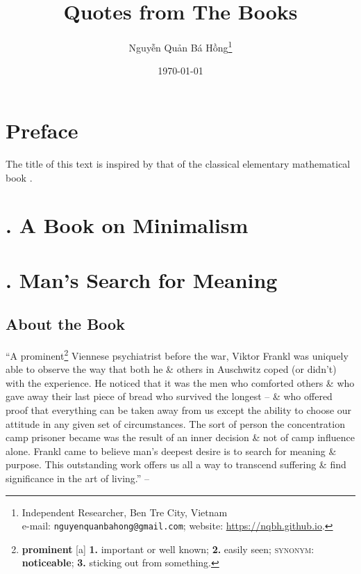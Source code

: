 \documentclass[oneside]{book}
\title{Quotes from The Books}
\author{\selectlanguage{vietnamese} Nguyễn Quản Bá Hồng\footnote{Independent Researcher, Ben Tre City, Vietnam\\e-mail: \texttt{nguyenquanbahong@gmail.com}; website: \url{https://nqbh.github.io}.}}
\date{\today}
\numberwithin{equation}{section}
\begin{document}
\frontmatter
\maketitle
\setcounter{secnumdepth}{4}
\setcounter{tocdepth}{3}
\tableofcontents
\newpage


\chapter*{Preface}

The title of this text is inspired by that of the classical elementary mathematical book \cite{Andreescu_Dospinescu2010}.


\mainmatter

\chapter{\cite{Chi2022}. A Book on Minimalism}


\chapter{\cite{Frankl2013, Frankl2017, Frankl2022}. Man's Search for Meaning}

\section{About the Book}
``A prominent\footnote{\textbf{prominent} [a] \textbf{1.} important or well known; \textbf{2.} easily seen; \textsc{synonym}: \textbf{noticeable}; \textbf{3.} sticking out from something.} Viennese psychiatrist before the war, Viktor Frankl was uniquely able to observe the way that both he \& others in Auschwitz coped (or didn't) with the experience. He noticed that it was the men who comforted others \& who gave away their last piece of bread who survived the longest -- \& who offered proof that everything can be taken away from us except the ability to choose our attitude in any given set of circumstances. The sort of person the concentration camp prisoner became was the result of an inner decision \& not of camp influence alone. Frankl came to believe man's deepest desire is to search for meaning \& purpose. This outstanding work offers us all a way to transcend suffering \& find significance in the art of living.'' -- \cite[About the Book, p. 3]{Frankl2013}
\end{document}

